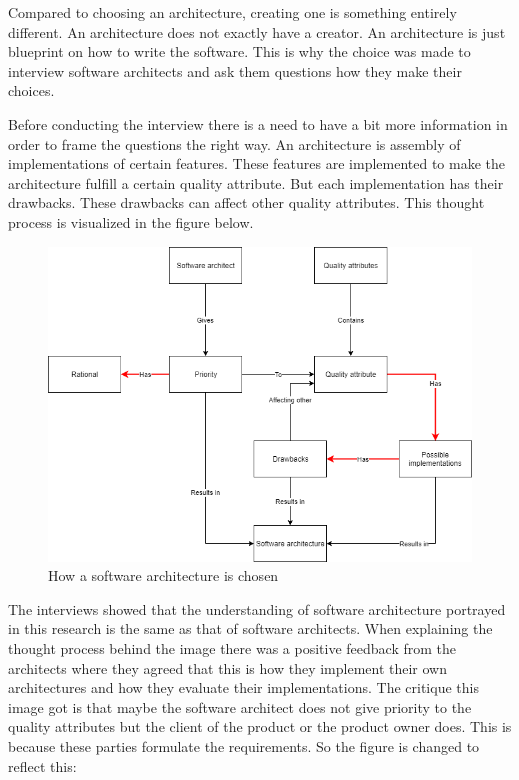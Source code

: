 Compared to choosing an architecture, creating one is something entirely different. An architecture does not exactly have a creator. An architecture is just blueprint on how to write the software. This is why the choice was made to interview software architects and ask them questions how they make their choices.

Before conducting the interview there is a need to have a bit more information in order to frame the questions the right way. An architecture is assembly of implementations of certain features. These features are implemented to make the architecture fulfill a certain quality attribute. But each implementation has their drawbacks. These drawbacks can affect other quality attributes. This thought process is visualized in the figure below.

\begin{figure}[H]
	\includegraphics[width=\linewidth]{creating_architecture.png}
	\caption{How a software architecture is chosen}
\end{figure}

The interviews showed that the understanding of software architecture portrayed in this research is the same as that of software architects. When explaining the thought process behind the image there was a positive feedback from the architects where they agreed that this is how they implement their own architectures and how they evaluate their implementations. The critique this image got is that maybe the software architect does not give priority to the quality attributes but the client of the product or the product owner does. This is because these parties formulate the requirements. So the figure is changed to reflect this:

